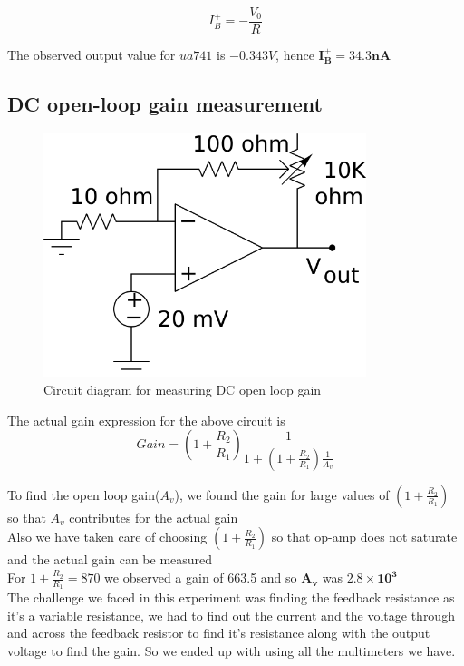 \documentclass[12pt]{article}
\begin{document}
        \begin{equation}
            I^+_B = -\frac{V_0}{R}
        \end{equation}
        
        The observed output value for $ua 741$ is  $-0.343V$, hence $\mathbf{I^+_B = 34.3nA}$
      
      \subsection{DC open-loop gain measurement}
      \begin{figure}[H]
            \centering
            \includegraphics[width = 0.6\linewidth, height = 2.8in]{XC24827.png}
            \caption{Circuit diagram for measuring DC open loop gain}
        \end{figure}
      The actual gain expression for the above circuit is
      \begin{equation}
          Gain = \left(1 + \frac{R_2}{R_1}\right)\frac{1}{1 + \left(1 + \frac{R_2}{R_1}\right)\frac{1}{A_v}} 
      \end{equation}
      
      To find the open loop gain($A_v$), we found the gain for large values of $\left(1 + \frac{R_2}{R_1}\right)$ so that $A_v$ contributes for the actual gain \\
      Also we have taken care of choosing $\left(1 + \frac{R_2}{R_1}\right)$ so that op-amp does not saturate and the actual gain can be measured \\
      
      For $1 + \frac{R_2}{R_1} = 870$ we observed a gain of 663.5 and so $\mathbf{A_v}$ was $\mathbf{2.8\times10^3}$    \\
      
      The challenge we faced in this experiment was finding the feedback resistance as it's a variable resistance, we had to find out the current and the voltage through and across the feedback resistor to find it's resistance along with the output voltage to find the gain. So we ended up with using all the multimeters we have.\\
      
\end{document}
